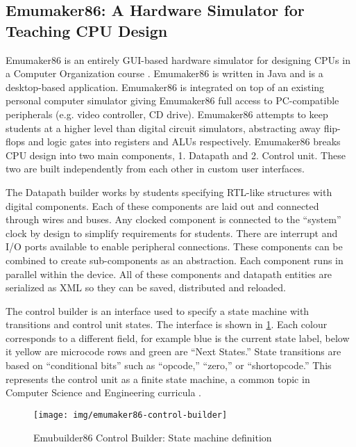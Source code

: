 \subsection{Emumaker86: A Hardware Simulator for Teaching CPU Design}
\label{sec:review-emumaker86}

Emumaker86 is an entirely GUI-based hardware simulator for designing CPUs in a Computer Organization course \cite{Black2013}. Emumaker86 is written in Java and is a desktop-based application. Emumaker86 is integrated on top of an existing personal computer simulator giving Emumaker86 full access to PC-compatible peripherals (e.g. video controller, CD drive). Emumaker86 attempts to keep students at a higher level than digital circuit simulators, abstracting away flip-flops and logic gates into registers and ALUs respectively. Emumaker86 breaks CPU design into two main components, 1. Datapath and 2. Control unit. These two are built independently from each other in custom user interfaces. 

The Datapath builder works by students specifying RTL-like structures with digital components. Each of these components are laid out and connected through wires and buses. Any clocked component is connected to the ``system'' clock by design to simplify requirements for students. There are interrupt and I/O ports available to enable peripheral connections. These components can be combined to create sub-components as an abstraction. Each component runs in parallel within the device. All of these components and datapath entities are serialized as XML so they can be saved, distributed and reloaded. 

The control builder is an interface used to specify a state machine with transitions and control unit states. The interface is shown in \cref{fig:emumaker86-control-builder}. Each colour corresponds to a different field, for example blue is the current state label, below it yellow are microcode rows and green are ``Next States.'' State transitions are based on ``conditional bits'' such as ``opcode,'' ``zero,'' or ``shortopcode.'' This represents the control unit as a finite state machine, a common topic in Computer Science and Engineering curricula \cite{cec2016}. 

\begin{figure}[tp!]
    \centering
    \texttt{[image: img/emumaker86-control-builder]}
    \caption{Emubuilder86 Control Builder: State machine definition \cite[p.~325]{Black2013}}
    \label{fig:emumaker86-control-builder}
\end{figure}

